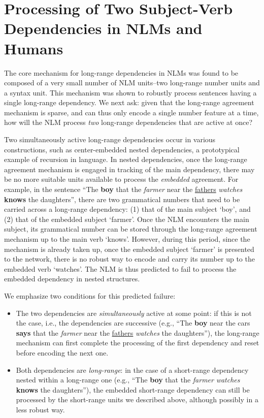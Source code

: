 \section{Processing of Two Subject-Verb Dependencies in NLMs and Humans}
The core mechanism for long-range dependencies in NLMs was found to be composed of a very small number of NLM units--two long-range number units and a syntax unit. This mechanism was shown to robustly process sentences having a single long-range dependency. We next ask: given that the long-range agreement mechanism is sparse, and can thus only encode a single number feature at a time, how will the NLM process \emph{two} long-range dependencies that are active at once?

Two simultaneously active long-range dependencies occur in various constructions, such as center-embedded nested dependencies, a prototypical example of recursion in language. In nested dependencies, once the long-range agreement mechanism is engaged in tracking of the main dependency, there may be no more suitable units available to process the \textit{embedded} agreement. For example, in the sentence ``The \textbf{boy} that the \textit{farmer} near the \underline{fathers} \textit{watches} \textbf{knows} the daughters'', there are two grammatical numbers that need to be carried across a long-range dependency: (1) that of the main subject `boy', and (2) that of the embedded subject `farmer'. Once the NLM  encounters the main subject, its grammatical number can be stored through the long-range agreement mechanism up to the main verb `knows'. However, during this period, since the mechanism is already taken up, once the embedded subject `farmer' is presented to the network, there is no robust way to encode and carry its number up to the embedded verb `watches'. The NLM is thus predicted to fail to process the embedded dependency in nested structures.

We emphasize two conditions for this predicted failure:
\begin{itemize}
	\item The two dependencies are \textit{simultaneously} active at some point: if this is not the case, i.e., the dependencies are successive (e.g., ``The \textbf{boy} near the cars \textbf{says} that the \textit{farmer} near the \underline{fathers} \textit{watches} the daughters''), the long-range mechanism can first complete the processing of the first dependency and reset before encoding the next one. 

        \item Both dependencies are \textit{long-range}: in the case
          of a short-range dependency nested within a long-range one
          (e.g., ``The \textbf{boy} that the \textit{farmer}
          \textit{watches} \textbf{knows} the daughters''), the
          embedded short-range dependency can still be processed by
          the short-range units we described above, although possibly
          in a less robust way.
\end{itemize}


